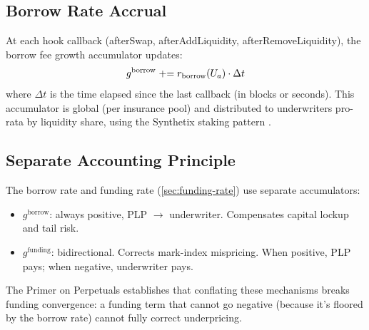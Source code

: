 \subsection{Borrow Rate Accrual}

\begin{definition}\label{def:borrow-accumulator}
At each hook callback (afterSwap, afterAddLiquidity, afterRemoveLiquidity),
the borrow fee growth accumulator updates:
\begin{equation}\label{eq:borrow-accumulator}
  g^{\text{borrow}} \mathrel{+}= r_{\text{borrow}}(U_a) \cdot \Delta t
\end{equation}
where $\Delta t$ is the time elapsed since the last callback (in blocks or seconds).
This accumulator is global (per insurance pool) and distributed to underwriters
pro-rata by liquidity share, using the Synthetix staking pattern
\cite{batog2018scalable}.
\end{definition}

\subsection{Separate Accounting Principle}

\begin{remark}
The borrow rate and funding rate (\cref{sec:funding-rate}) use separate
accumulators:
\begin{itemize}
  \item $g^{\text{borrow}}$: always positive, PLP $\to$ underwriter.
    Compensates capital lockup and tail risk.
  \item $g^{\text{funding}}$: bidirectional. Corrects mark-index mispricing.
    When positive, PLP pays; when negative, underwriter pays.
\end{itemize}
The Primer on Perpetuals \cite[Section~3]{angeris2022perpetuals} establishes that
conflating these mechanisms breaks funding convergence: a funding term that
cannot go negative (because it's floored by the borrow rate) cannot fully
correct underpricing.
\end{remark}

